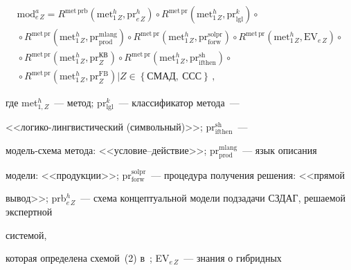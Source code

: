  \begin{multline}


\mathrm{mod}^a_{e\,Z}= R^{\mathrm{met}\,\mathrm{prb}}\left(


\mathrm{met}^h_{1\,Z},\mathrm{pr}^h_{e\,Z}\right)\circ


R^{\mathrm{met\,pr}}\left( \mathrm{met}^h_{1\,Z},\mathrm{pr}^k_{\mathrm{lgl}}\right) \circ {}\\


{}\circ R^{\mathrm{met\,pr}}\left(


\mathrm{met}^h_{1\,Z},\mathrm{pr}_{\mathrm{prod}}^{\mathrm{mlang}}\right)


\circ R^{\mathrm{met\,pr}}\left( \mathrm{met}^h_{1\,Z},\mathrm{pr}_{\mathrm{forw}}^{\mathrm{solpr}}\right)\circ


R^{\mathrm{met\,pr}}\left(


\mathrm{met}^h_{1\,Z},\mathrm{EV}_{e\,Z}\right) \circ{}\\


{}\circ R^{\mathrm{met\,pr}}\left( \mathrm{met}^h_{1\,Z},


\mathrm{pr}_Z^{\mathrm{КВ}}\right) \circ R^{\mathrm{met\,pr}}\left( \mathrm{met}^h_{1\,Z}, \mathrm{pr}^{\mathrm{sh}}_{\mathrm{ifthen}}\right)


 \circ {}\\


 {}\circ R^{\mathrm{met\,pr}}\left(


\mathrm{met}^h_{1\,Z},\mathrm{pr}_Z^{\mathrm{FB}}\right)\Big\vert Z\in \left\{ \mathrm{СМАД},\ \mathrm{ССС}\right\}\,,


 \label{e6-kir}


 \end{multline}


где met$_{1,Z}^h$~--- метод; pr$^k_{\mathrm{lgl}}$~--- классификатор метода~---


<<ло\-ги\-ко-линг\-ви\-сти\-че\-ский (символьный)>>; pr$^{\mathrm{sh}}_{\mathrm{ifthen}}$~---


мо\-дель-схе\-ма метода: <<усло\-вие--дейст\-вие>>; pr$_{\mathrm{prod}}^{\mathrm{mlang}}$~--- язык описания


модели: <<продукции>>; pr$_{\mathrm{forw}}^{\mathrm{solpr}}$~--- процедура получения решения: <<прямой


вывод>>; prb$^h_{e\,Z}$~--- схема концептуальной модели подзадачи СЗДАГ, решаемой экспертной


системой,


которая определена схемой~(2) в~\cite{1-kir}; EV$_{e\,Z}$~--- знания о гибридных


